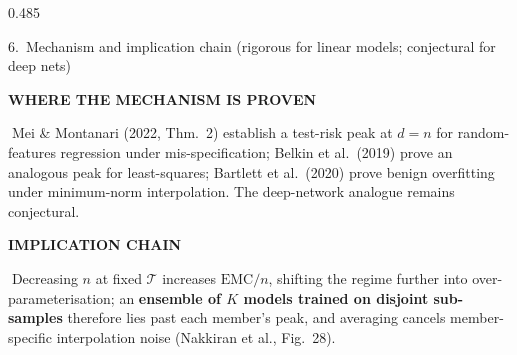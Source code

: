\documentclass[final]{beamer}
\newcommand{\kw}[1]{\textcolor{uompurple}{\textbf{#1}}}
\newcommand{\eyebrow}[1]{{\color{uompurple}\footnotesize\bfseries\MakeUppercase{#1}}\par\vspace{-0.2ex}}
\newcommand{\T}{\mathcal{T}}
\begin{document}
\begin{frame}[t]{}
\begin{columns}[T,onlytextwidth]
\begin{column}{0.485\linewidth}
\begin{block}{6.~Mechanism and implication chain (rigorous for linear models; conjectural for deep nets)}
\vspace{0.4ex}
\centering
{}

\justifying
\vspace{0.3ex}
\eyebrow{Where the mechanism is proven}
\(\;\)Mei \& Montanari (2022, Thm.~2) establish a test-risk peak at \(d{=}n\) for random-features regression under mis-specification; Belkin et al.\ (2019) prove an analogous peak for least-squares; Bartlett et al.\ (2020) prove benign overfitting under minimum-norm interpolation. The deep-network analogue remains conjectural.

\vspace{0.3ex}
\eyebrow{Implication chain}
\(\;\)Decreasing \(n\) at fixed \(\T\) increases \(\mathrm{EMC}/n\), shifting the regime further into over-parameterisation; an \kw{ensemble of \(K\) models trained on disjoint sub-samples} therefore lies past each member's peak, and averaging cancels member-specific interpolation noise (Nakkiran et al., Fig.~28).
\end{block}
\end{column}
\end{columns}

\vspace{-0.25cm}

\begin{columns}[T,onlytextwidth]


\end{columns}
\end{frame}
\end{document}
